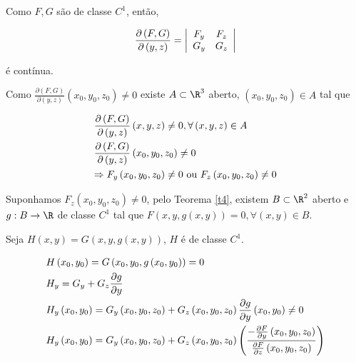 \documentclass{book}
\begin{document}
\begin{dem}
Como $F,G$ s\~ao de classe $C^1$, ent\~ao,

\[
\frac{{\partial \left( {F,G} \right)}}
{{\partial \left( {y,z} \right)}} = \left| {\begin{array}{*{20}c}
{F_y } & {F_z }  \\
{G_y } & {G_z }  \\

\end{array} } \right|
\]

\'e cont\'inua.

Como $\frac{{\partial \left( {F,G} \right)}}
{{\partial \left( {y,z} \right)}}\left( {x_0 ,y_0 ,z_0 } \right) \ne 0$ existe $A \subset \R^3$ aberto, $\left( {x_0 ,y_0 ,z_0 } \right) \in A$ tal que

\[
\begin{gathered}
\frac{{\partial \left( {F,G} \right)}}
{{\partial \left( {y,z} \right)}}\left( {x,y,z} \right) \ne 0,\forall \left( {x,y,z} \right) \in A \hfill \\
\frac{{\partial \left( {F,G} \right)}}
{{\partial \left( {y,z} \right)}}\left( {x_0 ,y_0 ,z_0 } \right) \ne 0 \hfill \\
   \Rightarrow F_y \left( {x_0 ,y_0 ,z_0 } \right) \ne 0{\text{ ou }}F_z \left( {x_0 ,y_0 ,z_0 } \right) \ne 0 \hfill \\
\end{gathered}
\]

    Suponhamos $F_z \left( {x_0 ,y_0 ,z_0 } \right) \ne 0$, pelo Teorema \ref{t4}, existem $B \subset \R^2$ aberto e $g:B \to \R$ de classe $C^1$ tal que $F\left( {x,y,g\left( {x,y} \right)} \right) = 0,\forall \left( {x,y} \right) \in B$.

    Seja $H\left( {x,y} \right) = G\left( {x,y,g\left( {x,y} \right)} \right)$, $H$ \'e de classe $C^1$.

\[
\begin{gathered}
  H\left( {x_0 ,y_0 } \right) = G\left( {x_0 ,y_0 ,g\left( {x_0 ,y_0 } \right)} \right) = 0 \hfill \\
H_y  = G_y  + G_z \frac{{\partial g}}
{{\partial y}} \hfill \\
  H_y \left( {x_0 ,y_0 } \right) = G_y \left( {x_0 ,y_0 ,z_0 } \right) + G_z \left( {x_0 ,y_0 ,z_0 } \right)\frac{{\partial g}}
{{\partial y}}\left( {x_0 ,y_0 } \right) \ne 0 \hfill \\
  H_y \left( {x_0 ,y_0 } \right) = G_y \left( {x_0 ,y_0 ,z_0 } \right) + G_z \left( {x_0 ,y_0 ,z_0 } \right)\left( {\frac{{ - \frac{{\partial F}}
{{\partial y}}\left( {x_0 ,y_0 ,z_0 } \right)}}
{{\frac{{\partial F}}
{{\partial z}}\left( {x_0 ,y_0 ,z_0 } \right)}}} \right) \hfill \\
\end{gathered}
\]


\end{dem}
\end{document}
